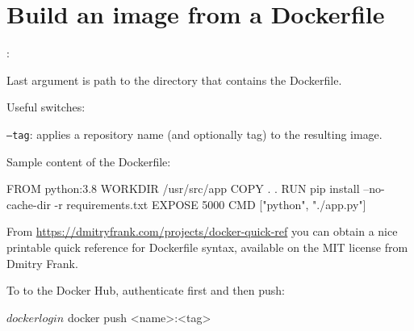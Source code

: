 \section{Build an image from a Dockerfile}
:

Last argument is path to the directory that contains the Dockerfile.

Useful switches:
\begin{compactitem}
    \item \texttt{--tag}: applies a repository name (and optionally tag) to the resulting image.
\end{compactitem}

Sample content of the Dockerfile:
\begin{bashcode}
FROM python:3.8
WORKDIR /usr/src/app
COPY . .
RUN pip install --no-cache-dir -r requirements.txt
EXPOSE 5000
CMD ["python", "./app.py"]
\end{bashcode}

From \url{https://dmitryfrank.com/projects/docker-quick-ref} you can obtain a  nice printable quick reference for Dockerfile syntax, available on the MIT license from Dmitry Frank.

To  to the Docker Hub, authenticate first and then push:
\begin{bashcode}
$ docker login
$ docker push <name>:<tag>
\end{bashcode}

%